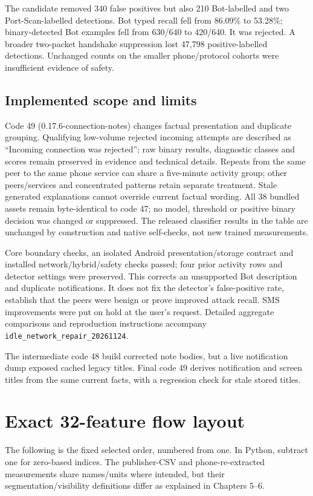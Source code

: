\documentclass[11pt,a4paper,oneside]{report}
\begin{document}
The candidate removed 340 false positives but also 210 Bot-labelled and two Port-Scan-labelled detections. Bot typed recall fell from 86.09\% to 53.28\%; binary-detected Bot examples fell from 630/640 to 420/640. It was rejected. A broader two-packet handshake suppression lost 47,798 positive-labelled detections. Unchanged counts on the smaller phone/protocol cohorts were insufficient evidence of safety.

\section{Implemented scope and limits}
Code 49 (0.17.6-connection-notes) changes factual presentation and duplicate grouping. Qualifying low-volume rejected incoming attempts are described as ``Incoming connection was rejected''; raw binary results, diagnostic classes and scores remain preserved in evidence and technical details. Repeats from the same peer to the same phone service can share a five-minute activity group; other peers/services and concentrated patterns retain separate treatment. Stale generated explanations cannot override current factual wording. All 38 bundled assets remain byte-identical to code 47; no model, threshold or positive binary decision was changed or suppressed. The released classifier results in the table are unchanged by construction and native self-checks, not new trained measurements.

Core boundary checks, an isolated Android presentation/storage contract and installed network/hybrid/safety checks passed; four prior activity rows and detector settings were preserved. This corrects an unsupported Bot description and duplicate notifications. It does not fix the detector's false-positive rate, establish that the peers were benign or prove improved attack recall. SMS improvements were put on hold at the user's request. Detailed aggregate comparisons and reproduction instructions accompany \texttt{idle\_network\_repair\_20261124}.

The intermediate code 48 build corrected note bodies, but a live notification dump exposed cached legacy titles. Final code 49 derives notification and screen titles from the same current facts, with a regression check for stale stored titles.


\appendix
\chapter{Exact 32-feature flow layout}
The following is the fixed selected order, numbered from one. In Python, subtract one for zero-based indices. The publisher-CSV and phone-re-extracted measurements share names/units where intended, but their segmentation/visibility definitions differ as explained in Chapters 5--6.
\end{document}
